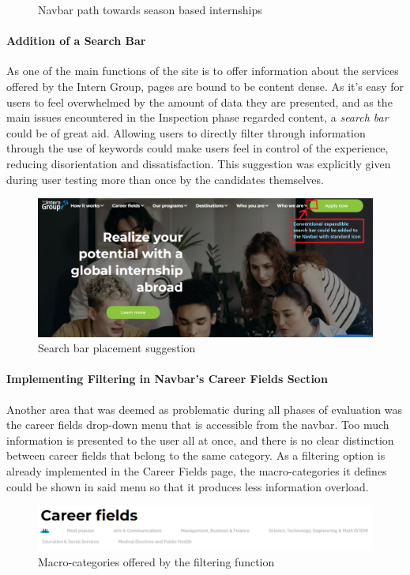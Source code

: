 \documentclass[11pt]{article} %
\begin{document}
\begin{figure}[ht]
\begin{minipage}[b]{0.48\textwidth}
    \caption{Navbar path towards season based internships}
  \end{minipage}
\end{figure}

\paragraph{Addition of a Search Bar}
As one of the main functions of the site is to offer information about the services offered by the Intern Group, pages are bound to be content dense. As it's easy for users to feel overwhelmed by the amount of data they are presented, and as the main issues encountered in the Inspection phase regarded content, a \textit{search bar} could be of great aid. Allowing users to directly filter through information through the use of keywords could make users feel in control of the experience, reducing disorientation and dissatisfaction. This suggestion was explicitly given during user testing more than once by the candidates themselves.

\begin{figure}[H]
  \centering
  \includegraphics[width=\textwidth]{Images/search_bar.png}
  \caption{Search bar placement suggestion}
\end{figure}

\paragraph{Implementing Filtering in Navbar's Career Fields Section}
Another area that was deemed as problematic during all phases of evaluation was the career fields drop-down menu that is accessible from the navbar. Too much information is presented to the user all at once, and there is no clear distinction between career fields that belong to the same category. As a filtering option is already implemented in the Career Fields page, the macro-categories it defines could be shown in said menu so that it produces less information overload. 
\begin{figure}[H]
  \centering
  \includegraphics[width=\textwidth]{Images/fields.png}
  \caption{Macro-categories offered by the filtering function}
\end{figure}
\end{document}
